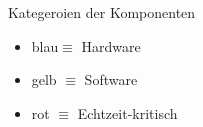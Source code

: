 \documentclass[xcolor=dvipsnames]{beamer}
\begin{document}
\begin{frame}
\begin{columns}
\begin{column}{0.70\textwidth}
\begin{minipage}{1.0\textwidth}
{\begin{tikzpicture}
		
						
						
					\end{tikzpicture}
				}
			\end{minipage}
		\end{column}
		\begin{column}{0.30\textwidth}
			\begin{block}{Kategeroien der Komponenten}
				\begin{itemize}
					\item blau$\equiv$ Hardware
					\item gelb $\equiv$ Software
					\item rot	$\equiv$ Echtzeit-kritisch
				\end{itemize}
				
				
			\end{block}
		\end{column}
	\end{columns}
\end{frame}
\end{document}
